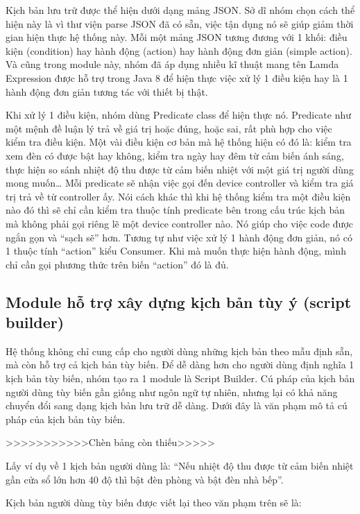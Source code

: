 \documentclass[12pt,a4paper,oneside]{extbook}
\begin{document}
Kịch bản lưu trữ được thể hiện dưới dạng mảng JSON. Sở dĩ nhóm chọn cách thể hiện này là vì thư viện parse JSON đã có sẵn, việc tận dụng nó sẽ giúp giảm thời gian hiện thực hệ thống này. Mỗi một mảng JSON tương đương với 1 khối: điều kiện (condition) hay hành động (action) hay hành động đơn giản (simple action). Và cũng trong module này, nhóm đã áp dụng nhiều kĩ thuật mang tên Lamda Expression được hỗ trợ trong Java 8 để hiện thực việc xử lý 1 điều kiện hay là 1 hành động đơn giản tương tác với thiết bị thật.

Khi xử lý 1 điều kiện, nhóm dùng Predicate class để hiện thực nó. Predicate như một mệnh đề luận lý trả về giá trị hoặc đúng, hoặc sai, rất phù hợp cho việc kiểm tra điều kiện. Một vài điều kiện cơ bản mà hệ thống hiện có đó là: kiểm tra xem đèn có được bật hay không, kiểm tra ngày hay đêm từ cảm biến ánh sáng, thực hiện so sánh nhiệt độ thu được từ cảm biến nhiệt với một giá trị người dùng mong muốn… Mỗi predicate sẽ nhận việc gọi đến device controller và kiểm tra giá trị trả về từ controller ấy. Nói cách khác thì khi hệ thống kiểm tra một điều kiện nào đó thì sẽ chỉ cần kiểm tra thuộc tính predicate bên trong cấu trúc kịch bản mà không phải gọi riêng lẽ một device controller nào. Nó giúp cho việc code được ngắn gọn và “sạch sẽ” hơn. Tương tự như việc xử lý 1 hành động đơn giản, nó có 1 thuộc tính “action” kiểu Consumer. Khi mà muốn thực hiện hành động, mình chỉ cần gọi phương thức trên biến “action” đó là đủ.

\subsection{Module hỗ trợ xây dựng kịch bản tùy ý (script builder)}\label{script-builder}

Hệ thống không chỉ cung cấp cho người dùng những kịch bản theo mẫu định sẵn, mà còn hỗ trợ cả kịch bản tùy biến. Để dễ dàng hơn cho người dùng định nghĩa 1 kịch bản tùy biến, nhóm tạo ra 1 module là Script Builder. Cú pháp của kịch bản người dùng tùy biến gần giống như ngôn ngữ tự nhiên, nhưng lại có khả năng chuyển đổi sang dạng kịch bản lưu trữ dễ dàng. Dưới đây là văn phạm mô tả cú pháp của kịch bản tùy biến.

>>>>>>>>>>>Chèn bảng còn thiếu>>>>>

Lấy ví dụ về 1 kịch bản người dùng là: “Nếu nhiệt độ thu được từ cảm biến nhiệt gần cửa sổ lớn hơn 40 độ thì bật đèn phòng và bật đèn nhà bếp”.

Kịch bản người dùng tùy biến được viết lại theo văn phạm trên sẽ là:
\end{document}
